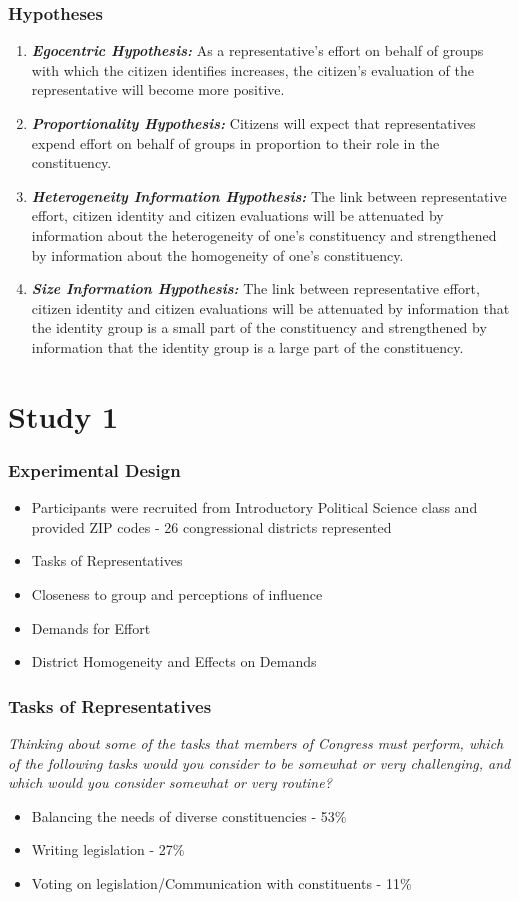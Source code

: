 \documentclass[14pt]{beamer}
\newcommand\e{\emph}
\newcommand\tb{\textbf}
\begin{document}
\begin{frame}
\footnotesize
\frametitle{Hypotheses}
\begin{enumerate}
	\item \tb{\e{Egocentric Hypothesis:}} As a representative's effort on behalf of groups with which the citizen identifies increases, the citizen's evaluation of the representative will become more positive. 
	\item \tb{\e{Proportionality Hypothesis:}} Citizens will expect that representatives expend effort on behalf of groups in proportion to their role in the constituency.
	\item \tb{\e{Heterogeneity Information Hypothesis:}} The link between representative effort, citizen identity and citizen evaluations will be attenuated by information about the heterogeneity of one’s constituency and strengthened by information about the homogeneity of one’s constituency. 
	\item \tb{\e{Size Information Hypothesis:}} The link between representative effort, citizen identity and citizen evaluations will be attenuated by information that the identity group is a small part of the constituency and strengthened by information that the identity group is a large part of the constituency. 
\end{enumerate}
\end{frame}

\section{Study 1}
\begin{frame}
\frametitle{Experimental Design}
\begin{itemize}
	\item Participants were recruited from Introductory Political Science class and provided ZIP codes - 26 congressional districts represented
	\item Tasks of Representatives
	\item Closeness to group and perceptions of influence
	\item Demands for Effort
	\item District Homogeneity and Effects on Demands 
\end{itemize}
\end{frame}

\begin{frame}
\frametitle{Tasks of Representatives}
\small
\begin{center}
	\e{Thinking about some of the tasks that members of Congress must perform, which of the following tasks would you consider to be somewhat or very challenging, and which would you consider somewhat or very routine?}
\end{center}
\begin{itemize}
	\item Balancing the needs of diverse constituencies - 53\% 
	\item Writing legislation - 27\%
	\item Voting on legislation/Communication with constituents - 11\%
\end{itemize}
\end{frame}
\end{document}
